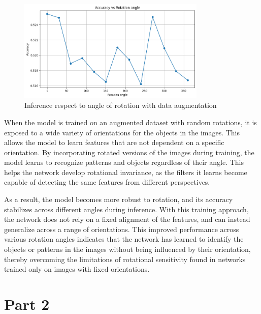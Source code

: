 \documentclass{article}
\begin{document}
\begin{figure}[H]
    \centering
    \includegraphics[width=0.8\textwidth]{rot_angles_aug.png}
    \caption{Inference respect to angle of rotation with data augmentation}
    \label{fig:angle_inference_aug}
\end{figure}

When the model is trained on an augmented dataset with random rotations, it is exposed to a wide variety of orientations for
the objects in the images. This allows the model to learn features that are not dependent on a specific orientation. By
incorporating rotated versions of the images during training, the model learns to recognize patterns and objects regardless
of their angle. This helps the network develop rotational invariance, as the filters it learns become capable of detecting
the same features from different perspectives.

As a result, the model becomes more robust to rotation, and its accuracy stabilizes across different angles during inference.
With this training approach, the network does not rely on a fixed alignment of the features, and can instead generalize across
a range of orientations. This improved performance across various rotation angles indicates that the network has learned to
identify the objects or patterns in the images without being influenced by their orientation, thereby overcoming the limitations
of rotational sensitivity found in networks trained only on images with fixed orientations.

\newpage

\section*{Part 2}



















 
\end{document}
